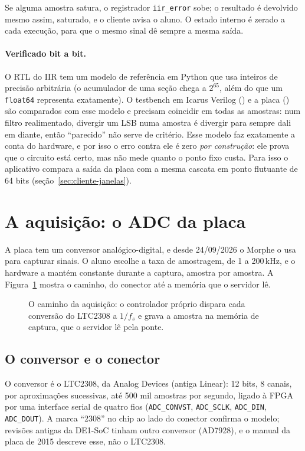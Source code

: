 Se alguma amostra satura, o registrador \texttt{iir\_error} sobe; o resultado
é devolvido mesmo assim, saturado, e o cliente avisa o aluno. O estado interno é
zerado a cada execução, para que o mesmo sinal dê sempre a mesma saída.

\paragraph{Verificado bit a bit.} O RTL do IIR tem um modelo de referência em
Python que usa inteiros de precisão arbitrária (o acumulador de uma seção
chega a \(2^{65}\), além do que um \texttt{float64} representa exatamente). O
testbench em Icarus Verilog () e a placa
() são comparados com esse modelo e precisam coincidir
em todas as amostras: num filtro realimentado, divergir um LSB numa amostra é
divergir para sempre dali em diante, então ``parecido'' não serve de critério.
Esse modelo faz exatamente a conta do hardware, e por isso o erro contra ele é
zero \emph{por construção}: ele prova que o circuito está certo, mas não mede
quanto o ponto fixo custa. Para isso o aplicativo compara a saída da placa com a
mesma cascata em ponto flutuante de 64 bits (seção~\ref{sec:cliente-janelas}).

\section{A aquisição: o ADC da placa}
\label{sec:adc}

A placa tem um conversor analógico-digital, e desde 24/09/2026 o Morphe o usa
para capturar sinais. O aluno escolhe a taxa de amostragem, de 1 a 200\,kHz, e o
hardware a mantém constante durante a captura, amostra por amostra. A
Figura~\ref{fig:adc}
mostra o caminho, do conector até a memória que o servidor lê.

\begin{figure}[htbp]
  \centering
  \caption{O caminho da aquisição: o controlador próprio dispara cada conversão
    do LTC2308 a \(1/f_s\) e grava a amostra na memória de captura, que o
    servidor lê pela ponte.}
  \label{fig:adc}
\end{figure}

\subsection{O conversor e o conector}

O conversor é o LTC2308, da Analog Devices (antiga Linear): 12 bits, 8 canais,
por aproximações sucessivas, até 500 mil amostras por segundo, ligado à FPGA
por uma interface serial de quatro fios (\texttt{ADC\_CONVST},
\texttt{ADC\_SCLK}, \texttt{ADC\_DIN}, \texttt{ADC\_DOUT}). A marca ``2308'' no
chip ao lado do conector confirma o modelo; revisões antigas da DE1-SoC tinham
outro conversor (AD7928), e o manual da placa de 2015 descreve esse, não o
LTC2308.

